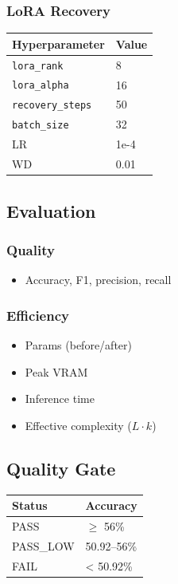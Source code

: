 \subsubsection{LoRA Recovery}

\begin{table}[H]
\centering
\small
\begin{tabular}{ll}
\toprule
\textbf{Hyperparameter} & \textbf{Value} \\
\midrule
\texttt{lora\_rank} & 8 \\
\texttt{lora\_alpha} & 16 \\
\texttt{recovery\_steps} & 50 \\
\texttt{batch\_size} & 32 \\
LR & 1e-4 \\
WD & 0.01 \\
\bottomrule
\end{tabular}
\end{table}

\subsection{Evaluation}

\subsubsection{Quality}
\begin{itemize}
\item Accuracy, F1, precision, recall

\end{itemize}
\subsubsection{Efficiency}
\begin{itemize}
\item Params (before/after)
\item Peak VRAM
\item Inference time
\item Effective complexity ($L \cdot k$)

\end{itemize}
\subsection{Quality Gate}

\begin{table}[H]
\centering
\small
\begin{tabular}{ll}
\toprule
\textbf{Status} & \textbf{Accuracy} \\
\midrule
PASS & $\ge$ 56\% \\
PASS\_LOW & 50.92--56\% \\
FAIL & < 50.92\% \\
\bottomrule
\end{tabular}
\end{table}


